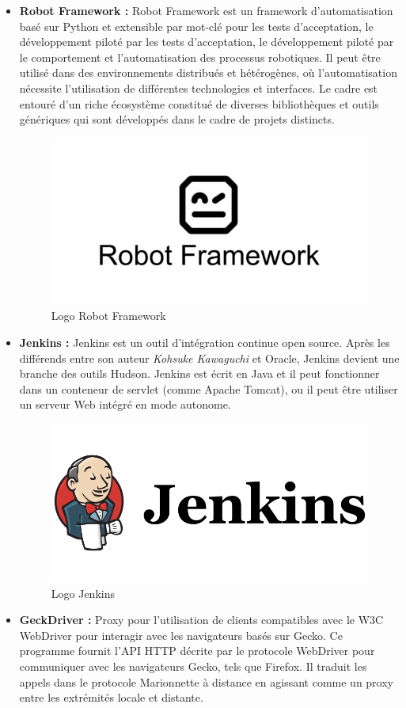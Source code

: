 \begin{itemize}
	\item \textbf{Robot Framework :} Robot Framework est un framework d'automatisation basé sur Python et extensible par mot-clé pour les tests d'acceptation, le développement piloté par les tests d'acceptation, le développement piloté par le comportement et l'automatisation des processus robotiques. Il peut être utilisé dans des environnements distribués et hétérogènes, où l'automatisation nécessite l'utilisation de différentes technologies et interfaces.	Le cadre est entouré d'un riche écosystème constitué de diverses bibliothèques et outils génériques qui sont développés dans le cadre de projets distincts. 
	\begin{figure}[H]
		\centering
		\includegraphics[width=0.4\linewidth]{img/logos/robot-framework}
		\caption[Logo Robot Framework]{Logo Robot Framework}
		\label{fig:robot-framework}
	\end{figure}
	\item \textbf{Jenkins :} Jenkins est un outil d'intégration continue open source. Après les différends entre son auteur \textit{Kohsuke Kawaguchi} et Oracle, Jenkins devient une branche des outils Hudson. Jenkins est écrit en Java et il peut fonctionner dans un conteneur de servlet (comme Apache Tomcat), ou il peut être utiliser un serveur Web intégré en mode autonome.
	\begin{figure}[H]
		\centering
		\includegraphics[width=0.3\linewidth]{img/logos/jenkins}
		\caption[Logo Jenkins]{Logo Jenkins}
		\label{fig:jenkins}
	\end{figure}
	\item \textbf{GeckDriver : }Proxy pour l'utilisation de clients compatibles avec le W3C WebDriver pour interagir avec les navigateurs basés sur Gecko. Ce programme fournit l'API HTTP décrite par le protocole WebDriver pour communiquer avec les navigateurs Gecko, tels que Firefox. Il traduit les appels dans le protocole Marionnette à distance en agissant comme un proxy entre les extrémités locale et distante. 

\end{itemize}
